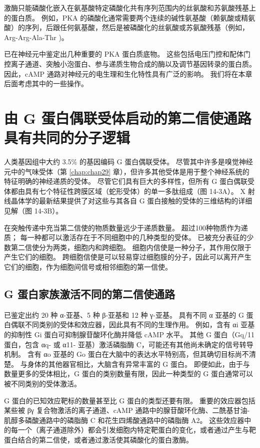激酶只能磷酸化嵌入在氨基酸特定磷酸化共有序列范围内的丝氨酸和苏氨酸残基上的蛋白质。
例如，PKA 的磷酸化通常需要两个连续的碱性氨基酸（赖氨酸或精氨酸）的序列，后跟任何氨基酸，然后是被磷酸化的丝氨酸或苏氨酸残基（例如，Arg-Arg-Ala-Thr )。


已在神经元中鉴定出几种重要的 PKA 蛋白质底物。
这些包括电压门控和配体门控离子通道、突触小泡蛋白、参与递质生物合成的酶以及调节基因转录的蛋白质。
因此，cAMP 通路对神经元的电生理和生化特性具有广泛的影响。
我们将在本章后面考虑其中的一些操作。


\section{由 G 蛋白偶联受体启动的第二信使通路具有共同的分子逻辑}

人类基因组中大约 3.5\% 的基因编码 G 蛋白偶联受体。
尽管其中许多是嗅觉神经元中的气味受体（第 \ref{chap:chap29} 章），但许多其他受体是用于整个神经系统的特征明确的神经递质的受体。
尽管它们具有巨大的多样性，但所有 G 蛋白偶联受体都由具有七个特征性跨膜区域（蛇形受体）的单一多肽组成（图 14-3A）。 
X 射线晶体学的最新结果提供了对这些与其各自 G 蛋白接触的受体的三维结构的详细见解（图 14-3B）。


在突触传递中充当第二信使的物质数量远少于递质数量。 超过100种物质作为递质； 每一种都可以激活存在于不同细胞中的几种类型的受体。
已被充分表征的少数第二信使分为两类，细胞内和跨细胞。
细胞内信使是一种分子，其作用仅限于产生它们的细胞。 
跨细胞信使是可以轻易穿过细胞膜的分子，因此可以离开产生它们的细胞，作为细胞间信号或相邻细胞的第一信使。


\subsection{G 蛋白家族激活不同的第二信使通路}
已鉴定出约 20 种 α-亚基、5 种 β-亚基和 12 种 γ-亚基。
具有不同 α 亚基的 G 蛋白偶联不同类别的受体和效应器，因此具有不同的生理作用。
例如，含有 αi 亚基的抑制性 Gi 蛋白可抑制腺苷酸环化酶并降低 cAMP 水平。
其他 G 蛋白（Gq/11 蛋白，包含 αq- 或 α11- 亚基）激活磷脂酶 C，可能还有其他尚未确定的信号转导机制。
含有 αo 亚基的 Go 蛋白在大脑中的表达水平特别高，但其确切目标尚不清楚。
与身体的其他器官相比，大脑含有异常丰富的 G 蛋白。 
即便如此，由于与数量更多的受体相比，G 蛋白的类别数量有限，因此一种类型的 G 蛋白通常可以被不同类别的受体激活。


G 蛋白的已知效应靶标的数量甚至比 G 蛋白的类型还要有限。
重要的效应器包括某些被 βγ 复合物激活的离子通道、cAMP 通路中的腺苷酸环化酶、二酰基甘油-肌醇多磷酸通路中的磷脂酶 C 和花生四烯酸通路中的磷脂酶 A2。 
这些效应器中的每一个（离子通道除外）都会引发细胞内特定靶蛋白的变化，或者通过产生与靶蛋白结合的第二信使，或者通过激活使其磷酸化的蛋白激酶。


